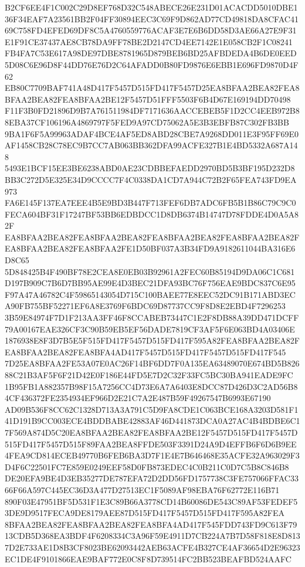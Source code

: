 \documentclass[UTF8,fontset=fandol,zihao=-4,a4paper]{ctexart}
\begin{document}
{{B2CF6EE4F1C002C29D8EF768D32C548ABECE26E231D01ACACDD5010DBE136F34EAF7A23561BB2F04FF30894EEC3C69F9D862AD77CD49818DA8CFAC41
69C758FD4EFED69DF8C5A4760559776ACAF3E7E6B6DD58D3AE66A27E9F31E1F91CE37437AE8CB78DA9FF78BE2D2147CD4EE7142E1E058CB2F1C08241
FB4FA7C53E617A98DE97DBE8781965D879BEB6BD25AFBDEDA4B6DE0EED5D08C6E96D8F44DD76E76D2C64AFADD0B80FD9876E6EBB1E696FD9870D4F62
EB80C7709BAF741A48D417F5457D515FD417F5457D25EA8BFAA2BEA82FEA8BFAA2BEA82FEA8BFAA2BE12F5457D51FFF5503F6B4D67E169194DD70498
F11F3B0FD21896D9B7A761511984DF7171636AACCEBEB5F1D2CC4EEB972B88EBA37CF106196A4869797F5FED9A97CD75062A5E3B3EBFB87C302FB3BB
9BA1F6F5A99963ADAF4BCE4AF5ED8ABD28CBE7A9268DD011E3F95FF69E0AF1458CB28C78EC9B7CC7AB063BB362DFA99ACFE327B1E4BD5332A687A148
5493E1BCF15EE3BE6238ABD0AE23CDBBEFAEDD2970BD5B3BF195D232D8BB3C272D5E325E34D9CCCC7F4C0338DA1CD7A944C72B2F65FEA743FD9EA973
FA6E145F137EA7EEE4B5E9BD3B447F713FEF6DB7ADC6FB5B1B86C79C9C0FECA604BF31F17247BF53BB6EDBDCC1D8DB6374B14747D78FDDE4D0A5A82F
EA8BFAA2BEA82FEA8BFAA2BEA82FEA8BFAA2BEA82FEA8BFAA2BEA82FEA8BFAA2BEA82FEA8BFAA2FE1D50BF037A3B34FD9A9182611044BA316E6D8C65
5D848425B4F490BF78E2CEA8E0EB03B92961A2FEC60B85194D9DA06C1C681D197B909C7B6D7BB95AE99E4D3BEC21DFA93BC76F756EAE9BDC837C6E95
F97A47A46782C4F59865143054D715C100BAEE77E8EEC52DC91B171ABD3ECA90FB755BF52271EF6A8E3769F6BDC69D87737CC9F8D8E2EBD4F7296253
3B59E84974F7D1F213AA3FF46F8CCABEB73447C1E2F8DB88A39DD471DCFF79A00167EAE326CF3C90B59EB5EF56DADE7819CF3AF5F6E063BD4A03406E
1876938E8F3D7B5E5F515FD417F5457D515FD417F595A82FEA8BFAA2BEA82FEA8BFAA2BEA82FEA8BFA4AD417F5457D515FD417F5457D515FD417F545
7D25EA8BFAA2FE53A07E0AC26F14BF6DD7F0A135EA63489070E674BD5B82688C21B3AF5F6F21D42E0F186E44FD5E7D2C32F33FC5BC30BA941EADE9FC
1B95FB1A882357B98F15A7256CC4D73E6A7A6403E8DCC87D426D3C2AD56B84CF436372FE2354934EF966D2E21C7A2E487B59F49267547B6993E67190
AD09B536F8CC62C1328D713A3A791C5D9FA8CDE1C063BCE168A3203D581F141D191B9CC003ECE4BDDBABE42883AF46D441873DCA0A27AC4B4BDBE6C1
7F569A874D5C20EA8BFAA2BEA82FEA8BFAA2BE12F5457D515FD417F5457D515FD417F5457D515F89FAA2BEA8FFDE503F3391D24A9D4EFFB6F6D6B9EE
4FEA9CD814ECEB49770B6FEB6BA3D7F1E4E7B646468E35ACFE32A963029F3D4F6C22501FC7E859E0249EEF58D0FB873EDEC4C0B211C0D7C5B8C846B8
DE20EFA9BE4D3EB35277DE787EFA72D2DD56FD1757738C3FE757066FFAC3366F66A597C445EC36D3A477D27513EC1F5089AF98EBA76F62772E116B71
890F03E47951BF5D531F1E3C89B66A3778CD14B60086DE543C89AF53FEDEF53DE9D9517FECA9DE8179AEE87D515FD417F5457D515FD417F595A82FEA
8BFAA2BEA82FEA8BFAA2BEA82FEA8BFA4AD417F545FDD743FD9C613F7913CDB5D368EA3BDF4F6208334C3A96F59E4911D7CB224A7B7D58F818E8D813
7D2E733AE1D8B3CF8023BE62093442AEB63ACFE4B327CE4AF36654D2E96323EC1DE4F9101866EAE9BAF772E0C8F8D739514FC2BB523BEAFBD524AAFC
}}
\end{document}
